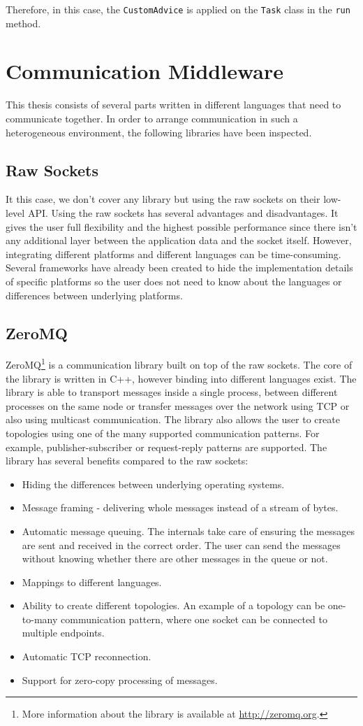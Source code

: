 Therefore, in this case, the \texttt{CustomAdvice} is applied on the \texttt{Task} class in the \texttt{run} method.
\section{Communication Middleware}
This thesis consists of several parts written in different languages that need to communicate together. In order to arrange communication in such a heterogeneous environment, the following libraries have been inspected.
\subsection{Raw Sockets}
\label{raw_sockets}
It this case, we don't cover any library but using the raw sockets on their low-level API. Using the raw sockets has several advantages and disadvantages. It gives the user full flexibility and the highest possible performance since there isn't any additional layer between the application data and the socket itself. However, integrating different platforms and different languages can be time-consuming. Several frameworks have already been created to hide the implementation details of specific platforms so the user does not need to know about the languages or differences between underlying platforms.
\subsection{ZeroMQ}
\label{zeromq}
ZeroMQ\footnote{More information about the library is available at \url{http://zeromq.org}.} is a communication library built on top of the raw sockets. The core of the library is written in C++, however binding into different languages exist. The library is able to transport messages inside a single process, between different processes on the same node or transfer messages over the network using TCP or also using multicast communication. The library also allows the user to create topologies using one of the many supported communication patterns. For example, publisher-subscriber or request-reply patterns are supported. The library has several benefits compared to the raw sockets:
\begin{itemize}
	\item Hiding the differences between underlying operating systems.
	\item Message framing - delivering whole messages instead of a stream of bytes.
	\item Automatic message queuing. The internals take care of ensuring the messages are sent and received in the correct order. The user can send the messages without knowing whether there are other messages in the queue or not.
	\item Mappings to different languages.
	\item Ability to create different topologies. An example of a topology can be one-to-many communication pattern, where one socket can be connected to multiple endpoints. 
	\item Automatic TCP reconnection.
	\item Support for zero-copy processing of messages.
\end{itemize}

